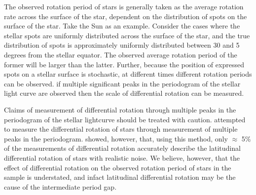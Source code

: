 The observed rotation period of stars is generally taken as the average rotation rate across the surface of the star, dependent on the distribution of spots on the surface of the star.
Take the Sun as an example.
Consider the cases where the stellar spots are uniformly distributed across the surface of the star, and the true distribution of spots is approximately uniformly distributed between 30 and 5 degrees from the stellar equator.
The observed average rotation period of the former will be larger than the latter.
Further, because the position of expressed spots on a stellar surface is stochastic, at different times different rotation periods can be observed.
if multiple significant peaks in the periodogram of the stellar light curve are observed then the scale of differential rotation can be measured.

Claims of measurement of differential rotation through multiple peaks in the periodogram of the stellar lightcurve should be treated with caution.
 \citet{reinhold_rotation_2013} attempted to measure the differential rotation of \kepler{} stars through measurement of multiple peaks in the periodogram.
 \citet{aigrain_} showed, however, that, using this method, only $\approx$ 5\% of the measurements of differential rotation accurately describe the latitudinal differential rotation of stars with realistic noise.
 We believe, however, that the effect of differential rotation on the observed rotation period of stars in the \kepler{} sample is understated, and infact latitudinal differential rotation may be the cause of the intermediate period gap.
 
